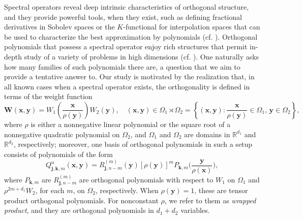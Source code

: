 \documentclass{amsart}
\theoremstyle{remark}
\def\jb{{\bm j}}
\def\kb{{\bm k}}
\def\xb{{\bm x}}
\def\yb{{\bm y}}
\def\Wb{{\bm W}}
\def\RR{{\mathbb R}}
\begin{document}
Spectral operators reveal deep intrinsic characteristics of orthogonal structure, and they provide powerful 
tools, when they exist, such as defining fractional derivatives in Sobolev spaces or the $K$-functional for 
interpolation spaces that can be used to characterize the best approximation by polynomials (cf. \cite{LR, X21, X21b}). 
Orthogonal polynomials that possess a spectral operator enjoy rich structures that permit in-depth study of 
a variety of problems in high dimensions (cf. \cite{DaiX}). One naturally asks how many families of such 
polynomials there are, a question that we aim to provide a tentative answer to. Our study is motivated by 
the realization that, in all known cases when a spectral operator exists, the orthogonality is defined in 
terms of the weight function 
$$
   \Wb(\xb,\yb) = W_1\left(\frac{\xb}{\rho(\yb)}\right) W_2(\yb), \quad (\xb, \yb) \in \Omega_1 \rtimes \Omega_2 = \left \{(\xb,\yb): \frac{\xb}{\rho(\yb)} \in \Omega_1, \, \yb \in \Omega_2\right\},
$$
where $\rho$ is either a nonnegative linear polynomial or the square root of a nonnegative 
quadratic polynomial on $\Omega_2$, and $\Omega_1$ and $\Omega_2$ are domains in $\RR^{d_1}$
and $\RR^{d_2}$, respectively; moreover, one basis of orthogonal polynomials in such a setup consists of 
polynomials of the form 
$$
   Q_{\jb,\kb,m}^n(\xb,\yb) = R_{\jb, n-m}^{(m)} (\yb) [\rho(\yb)]^m P_{\kb, m}\bigg(\frac{\yb}{\rho(\xb)}\bigg), 
$$
where $P_{\kb, m}$ are  $R_{\jb, n-m}^{(m)}$ are orthogonal polynomials with respect to $W_1$ on $\Omega_1$
and $\rho^{2m+d_1} W_2$, for each $m$, on $\Omega_2$, respectively. When $\rho(\yb) = 1$, these are 
tensor product orthogonal polynomials. For nonconstant $\rho$, we refer to them as {\it wrapped product}, and
they are orthogonal polynomials in $d_1 + d_2$ variables. 
\end{document}
